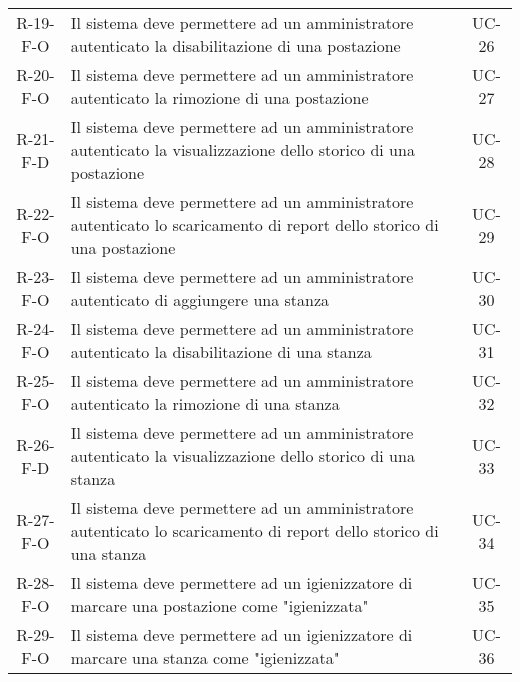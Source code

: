 \begin{longtable}{ c C{9cm} c }
    R-19-F-O & Il sistema deve permettere ad un amministratore autenticato la disabilitazione di una postazione & UC-26 \\
    R-20-F-O & Il sistema deve permettere ad un amministratore autenticato la rimozione di una postazione & UC-27 \\
    R-21-F-D & Il sistema deve permettere ad un amministratore autenticato la visualizzazione dello storico di una postazione & UC-28 \\
    R-22-F-O & Il sistema deve permettere ad un amministratore autenticato lo scaricamento di report dello storico di una postazione & UC-29 \\
    R-23-F-O & Il sistema deve permettere ad un amministratore autenticato di aggiungere una stanza & UC-30 \\
    R-24-F-O & Il sistema deve permettere ad un amministratore autenticato la disabilitazione di una stanza & UC-31 \\
    R-25-F-O & Il sistema deve permettere ad un amministratore autenticato la rimozione di una stanza & UC-32 \\
    R-26-F-D & Il sistema deve permettere ad un amministratore autenticato la visualizzazione dello storico di una stanza & UC-33 \\
    R-27-F-O & Il sistema deve permettere ad un amministratore autenticato lo scaricamento di report dello storico di una stanza & UC-34 \\
    R-28-F-O & Il sistema deve permettere ad un igienizzatore di marcare una postazione come "igienizzata" & UC-35 \\
    R-29-F-O & Il sistema deve permettere ad un igienizzatore di marcare una stanza come "igienizzata" & UC-36 \\
\end{longtable}